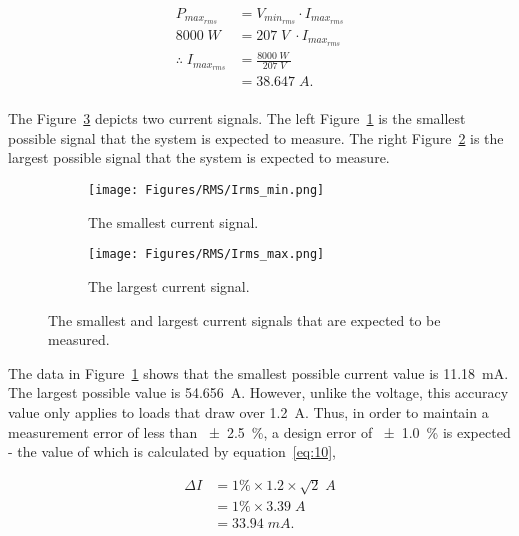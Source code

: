 \begin{equation}
\label{eq:9}
\begin{split}
    P_{max_{rms}}                   &= V_{min_{rms}} \cdot I_{max_{rms}} \\
    8000 \; W \;                    &= 207 \; V \; \cdot I_{max_{rms}} \\
    \therefore \; I_{max_{rms}}     &= \frac{8000 \; W \;}{207 \; V} \\
                                    &= 38.647 \; A.\\
\end{split}
\end{equation}


The Figure~\ref{fig:Current_Sim} depicts two current signals. The left Figure~\ref{fig:Current_Sim_a} is the smallest possible signal that the system is expected to measure. The right Figure~\ref{fig:Current_Sim_b} is the largest possible signal that the system is expected to measure.

\begin{figure}[H]
     \centering
     \begin{subfigure}[b]{0.495\textwidth}
        \centering
        \texttt{[image: Figures/RMS/Irms\_min.png]}
        \caption{The smallest current signal.}
        \label{fig:Current_Sim_a}
     \end{subfigure}
     \hfill
     \begin{subfigure}[b]{0.495\textwidth}
        \centering
        \texttt{[image: Figures/RMS/Irms\_max.png]}
        \caption{The largest current signal.}
        \label{fig:Current_Sim_b}
     \end{subfigure}
        \caption{The smallest and largest current signals that are expected to be measured.}
        \label{fig:Current_Sim}
\end{figure}

The data in Figure~\ref{fig:Current_Sim_a} shows that the smallest possible current value is \qty{11.18}{\mA}. The largest possible value is \qty{54.656}{\ampere}. However, unlike the voltage, this accuracy value only applies to loads that draw over \qty{1.2}{\ampere}. Thus, in order to maintain a measurement error of less than \qty{\pm 2.5}{\percent}, a design error of \qty{\pm 1.0}{\percent} is expected - the value of which is calculated by equation~\ref{eq:10},

\begin{equation}
\label{eq:10}
\begin{split}
    \Delta I &= 1\% \times 1.2 \times \sqrt{2} \; A\\
             &= 1\% \times  3.39\; A \\
             &= 33.94 \; mA .
\end{split}
\end{equation}


